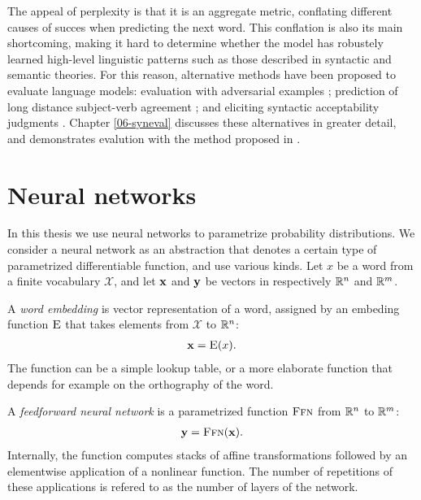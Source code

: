    The appeal of perplexity is that it is an aggregate metric, conflating different causes of succes when predicting the next word. This conflation is also its main shortcoming, making it hard to determine whether the model has robustely learned high-level linguistic patterns such as those described in syntactic and semantic theories. For this reason, alternative methods have been proposed to evaluate language models: evaluation with adversarial examples \citep{smith2012adversarial}; prediction of long distance subject-verb agreement \citep{linzen2016syntax}; and eliciting syntactic acceptability judgments \citep{linzen2018targeted}. Chapter \ref{06-syneval} discusses these alternatives in greater detail, and demonstrates evalution with the method proposed in \citep{linzen2018targeted}.


\section{Neural networks}

  In this thesis we use neural networks to parametrize probability distributions. We consider a neural network as an abstraction that denotes a certain type of parametrized differentiable function, and use various kinds. Let $x$ be a word from a finite vocabulary $\mathcal{X}$, and let $\mathbf{x}$ and $\mathbf{y}$ be vectors in respectively $\mathbb{R}^{n}$ and $\mathbb{R}^{m}$.

  \begin{definition}{} A \textit{word embedding} is vector representation of a word, assigned by an embeding function $\textsc{E}$ that takes elements from $\mathcal{X}$ to $\mathbb{R}^{n}$:
  \begin{align*}
    \mathbf{x} = \textsc{E}( x ).
  \end{align*}
  The function can be a simple lookup table, or a more elaborate function that depends for example on the orthography of the word.
  \end{definition}

  \begin{definition}{} A \textit{feedforward neural network} is a parametrized function $\textsc{Ffn}$ from $\mathbb{R}^{n}$ to $\mathbb{R}^{m}$:
  \begin{align*}
    \mathbf{y} = \textsc{Ffn}( \mathbf{x} ).
  \end{align*}
  Internally, the function computes stacks of affine transformations followed by an elementwise application of a nonlinear function. The number of repetitions of these applications is refered to as the number of layers of the network.
  \end{definition}

